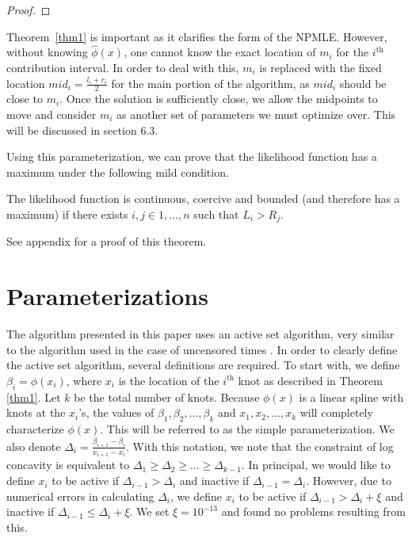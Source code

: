 \begin{proof}
	\end{proof}
	
	Theorem~\ref{thm1} is important as it clarifies the form of the NPMLE.  However, without knowing $\hat\phi(x)$, one cannot know the exact location of $m_i$ for the $i^{\text{th}}$ contribution interval. In order to deal with this, $m_i$ is replaced with the fixed location $mid_i = \frac{l_i + r_i}{2}$ for the main portion of the algorithm, as $mid_i$ should be close to $m_i$. Once the solution is sufficiently close, we allow the midpoints to move and consider $m_i$ as another set of parameters we must optimize over. This will be discussed in section 6.3. 
		
	Using this parameterization, we can prove that the likelihood function has a maximum under the following mild condition. 
		
	\begin{thm}
	\label{thm2}
	The likelihood function is continuous, coercive and bounded (and therefore has a maximum) if there exists $i,j \in 1, ... , n$ such that $L_i > R_j$. 
	
	
	
	
	
	
	\end{thm}
	
	See appendix for a proof of this theorem. 	
	\\
	{\section{Parameterizations} 
	\label{sec:params}	}

	The algorithm presented in this paper uses an active set algorithm, very similar to the algorithm used in the case of uncensored times \cite{RefRuf2007}. In order to clearly define the active set algorithm, several definitions are required. To start with, we define $\beta_i = \phi(x_i)$, where $x_i$ is the location of the $i^{\text{th}}$ knot as described in Theorem \ref{thm1}. Let $k$ be the total number of knots. Because $\phi(x)$ is a linear spline with knots at the $x_i$'s, the values of $\beta_1, \beta_2, ..., \beta_k$ and $x_1, x_2,..., x_k$ will completely characterize $\phi(x)$. This will be referred to as the simple parameterization. We also denote $\Delta_i = \frac{\beta_{i+1} - \beta_i} {x_{i+1} - x_i}$. With this notation, we note that the constraint of log concavity is equivalent to $\Delta_1 \geq \Delta_2 \geq ... \geq \Delta_{k-1}$. In principal, we would like to define $x_i$ to be active if $\Delta_{i-1} > \Delta_i$ and inactive if $\Delta_{i-1} = \Delta_i$. However, due to numerical errors in calculating $\Delta_i$, we define $x_i$ to be active if $\Delta_{i-1} > \Delta_i + \xi$ and inactive if $\Delta_{i-1} \leq \Delta_i + \xi$.  We set $\xi = 10^{-13}$ and found no problems resulting from this. 
	
